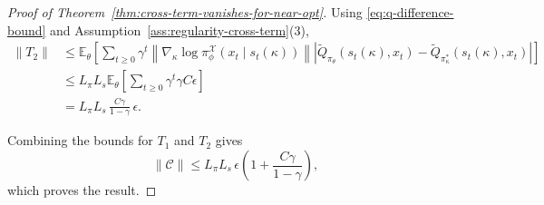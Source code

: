 \documentclass[10pt,a4paper]{amsart}
\begin{document}
\begin{proof}[Proof of Theorem~\ref{thm:cross-term-vanishes-for-near-opt}]
Using \eqref{eq:q-difference-bound} and Assumption~\ref{ass:regularity-cross-term}(3),
\begin{align*}
\|T_2\|
&\leq
\mathbb{E}_{\theta}\!\left[
\sum_{t\geq 0}\gamma^t
\left\|
\nabla_{\kappa}\log \pi^{\mathcal X}_{\phi}
(x_t\mid s_t(\kappa))
\right\|
\left|
\tilde Q_{\pi_\theta}(s_t(\kappa),x_t)
-
\tilde Q_{\pi^*_\kappa}(s_t(\kappa),x_t)
\right|
\right] \\
&\leq
L_\pi L_s
\mathbb{E}_{\theta}\!\left[
\sum_{t\geq 0}\gamma^t
\gamma C\epsilon
\right] \\
&=
L_\pi L_s\,
\frac{C\gamma}{1-\gamma}\,
\epsilon.
\end{align*}

Combining the bounds for $T_1$ and $T_2$ gives
\[
\|\mathcal C\|
\leq
L_\pi L_s\,\epsilon
\left(
1+\frac{C\gamma}{1-\gamma}
\right),
\]
which proves the result.
\end{proof}
\end{document}
